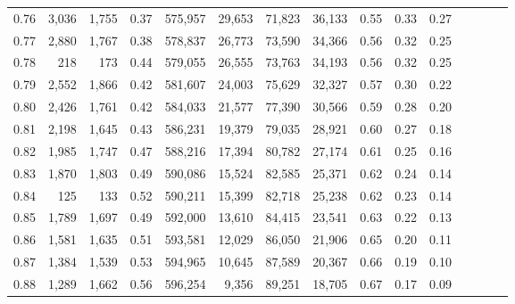 \begin{tabular}{rrrcrrrrrrrrrrr}
0.76 &   3,036 &  1,755 &                                       0.37 &  575,957 &   29,653 &   71,823 &   36,133 &  0.55 &  0.33 &                         0.27 \\
0.77 &   2,880 &  1,767 &                                       0.38 &  578,837 &   26,773 &   73,590 &   34,366 &  0.56 &  0.32 &                         0.25 \\
0.78 &     218 &    173 &                                       0.44 &  579,055 &   26,555 &   73,763 &   34,193 &  0.56 &  0.32 &                         0.25 \\
0.79 &   2,552 &  1,866 &                                       0.42 &  581,607 &   24,003 &   75,629 &   32,327 &  0.57 &  0.30 &                         0.22 \\
0.80 &   2,426 &  1,761 &                                       0.42 &  584,033 &   21,577 &   77,390 &   30,566 &  0.59 &  0.28 &                         0.20 \\
0.81 &   2,198 &  1,645 &                                       0.43 &  586,231 &   19,379 &   79,035 &   28,921 &  0.60 &  0.27 &                         0.18 \\
0.82 &   1,985 &  1,747 &                                       0.47 &  588,216 &   17,394 &   80,782 &   27,174 &  0.61 &  0.25 &                         0.16 \\
0.83 &   1,870 &  1,803 &                                       0.49 &  590,086 &   15,524 &   82,585 &   25,371 &  0.62 &  0.24 &                         0.14 \\
0.84 &     125 &    133 &                                       0.52 &  590,211 &   15,399 &   82,718 &   25,238 &  0.62 &  0.23 &                         0.14 \\
0.85 &   1,789 &  1,697 &                                       0.49 &  592,000 &   13,610 &   84,415 &   23,541 &  0.63 &  0.22 &                         0.13 \\
0.86 &   1,581 &  1,635 &                                       0.51 &  593,581 &   12,029 &   86,050 &   21,906 &  0.65 &  0.20 &                         0.11 \\
0.87 &   1,384 &  1,539 &                                       0.53 &  594,965 &   10,645 &   87,589 &   20,367 &  0.66 &  0.19 &                         0.10 \\
0.88 &   1,289 &  1,662 &                                       0.56 &  596,254 &    9,356 &   89,251 &   18,705 &  0.67 &  0.17 &                         0.09 \\

\end{tabular}
